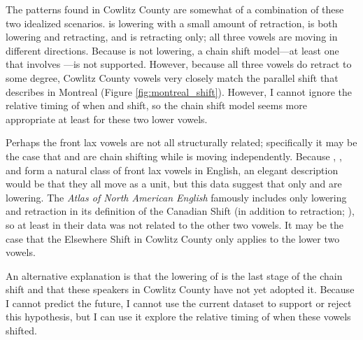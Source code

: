 The patterns found in Cowlitz County are somewhat of a combination of these two idealized scenarios. \bat is lowering with a small amount of retraction, \bet is both lowering and retracting, and \bit is retracting only; all three vowels are moving in different directions. Because \bit is not lowering, a chain shift model---at least one that involves \bit---is not supported. However, because all three vowels do retract to some degree, Cowlitz County vowels very closely match the parallel shift that \citet{boberg_2005} describes in Montreal (Figure \ref{fig:montreal_shift}). However, I cannot ignore the relative timing of when \bet and \bat shift, so the chain shift model seems more appropriate at least for these two lower vowels.

Perhaps the front lax vowels are not all structurally related; specifically it may be the case that \bet and \bat are chain shifting while \bit is moving independently. Because \bit, \bet, and \bat form a natural class of front lax vowels in English, an elegant description would be that they all move as a unit, but this data suggest that only \bet and \bat are lowering. The \textit{Atlas of North American English} famously includes only \bet lowering and \bat retraction in its definition of the Canadian Shift (in addition to \lot retraction; \citealt[219]{labov_ash_boberg_2006_anae}), so at least in their data \bit was not related to the other two vowels. It may be the case that the Elsewhere Shift in Cowlitz County only applies to the lower two vowels.

An alternative explanation is that the lowering of \bit is the last stage of the chain shift and that these speakers in Cowlitz County have not yet adopted it. Because I cannot predict the future, I cannot use the current dataset to support or reject this hypothesis, but I can use it explore the relative timing of when these vowels shifted.


